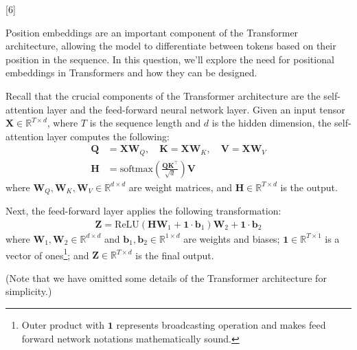 \graphicspath{ {images/} }

[6]
\label{sec:pos_enc}

Position embeddings are an important component of the Transformer architecture, allowing the model to differentiate between tokens based on their position in the sequence.
In this question, we'll explore the need for positional embeddings in Transformers and how they can be designed.

Recall that the crucial components of the Transformer architecture are the self-attention layer and the feed-forward neural network layer. 
Given an input tensor $\mathbf{X} \in \mathbb{R}^{T \times d}$, where $T$ is the sequence length and $d$ is the hidden dimension, the self-attention layer computes the following:
\begin{align*}
    \mathbf{Q} &= \mathbf{X}\mathbf{W}_Q, \quad \mathbf{K} = \mathbf{X}\mathbf{W}_K, \quad \mathbf{V} = \mathbf{X}\mathbf{W}_V \\
    \mathbf{H} &= \text{softmax}\left(\frac{\mathbf{Q}\mathbf{K}^{\top}}{\sqrt{d}}\right) \mathbf{V}
\end{align*}
where $\mathbf{W}_Q, \mathbf{W}_K, \mathbf{W}_V \in \mathbb{R}^{d \times d}$ are weight matrices, and $\mathbf{H} \in \mathbb{R}^{T \times d}$ is the output.

Next, the feed-forward layer applies the following transformation:
\begin{align*}
    \mathbf{Z} = \text{ReLU}(\mathbf{H}\mathbf{W}_1 + \mathbf{1}\cdot\mathbf{b}_1)\mathbf{W}_2 + \mathbf{1}\cdot\mathbf{b}_2
\end{align*}
where $\mathbf{W}_1, \mathbf{W}_2 \in \mathbb{R}^{d \times d}$ and $\mathbf{b}_1, \mathbf{b}_2 \in \mathbb{R}^{1\times d}$ are weights and biases; $\mathbf{1} \in \mathbb{R}^{T\times 1}$ is a vector of ones\footnote{Outer product with $\mathbf{1}$ represents broadcasting operation and makes feed forward network notations mathematically sound.}; and $\mathbf{Z} \in \mathbb{R}^{T \times d}$ is the final output.

(Note that we have omitted some details of the Transformer architecture for simplicity.)

